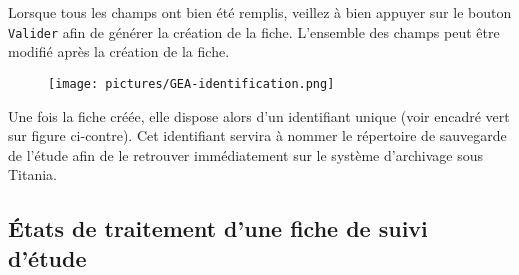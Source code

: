 Lorsque tous les champs ont bien été remplis, veillez à bien appuyer sur le bouton \texttt{Valider} afin de générer la création de la fiche. L'ensemble des champs peut être modifié après la création de la fiche.

\vspace{0.5cm}

\begin{minipage}[c]{0.5\linewidth}
   \begin{figure}[H]
      \centering
      \texttt{[image: pictures/GEA-identification.png]}
      \vspace*{0.2cm}
   \end{figure}
\end{minipage} \hfill
\begin{minipage}[c]{0.45\linewidth}
Une fois la fiche créée, elle dispose alors d'un identifiant unique (voir encadré vert sur figure ci-contre). Cet identifiant servira à nommer le répertoire de sauvegarde de l'étude afin de le retrouver immédiatement sur le système d'archivage sous Titania.

\end{minipage}


\subsection{États de traitement d'une fiche de suivi d'étude}

